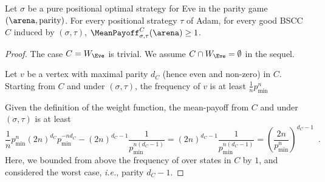 \begin{lemma}
  Let $\sigma$ be a pure positional optimal strategy for Eve in
  the parity game $(\arena,\textrm{parity})$. For every positional
  strategy $\tau$ of Adam, for every good BSCC $C$ induced by
  $(\sigma,\tau)$, $\MeanPayoff_{\sigma,\tau}^C(\arena) \geq 1$.
\end{lemma}
\begin{proof}
  The case $C = W_\Eve$ is trivial. We assume
  $C \cap W_\Eve = \emptyset$ in the sequel.
  
  Let $v$ be a vertex with maximal parity $d_C$ (hence even and
  non-zero) in $C$. Starting from $C$ and under $(\sigma,\tau)$,
  the frequency of $v$ is at least $\frac{1}{n} p_{\min}^n$

  Given the definition of the weight function, the mean-payoff
  from $C$ and under $(\sigma,\tau)$ is at least
  \[
    \frac{1}{n} p_{\min}^n (2n)^{d_C} p_{\min}^{-n d_C} -
    (2n)^{d_C -1} \frac{1}{p_{\min}^{n (d_C-1)}} = (2n)^{d_C -1}
    \frac{1}{p_{\min}^{n (d_C-1)}} =
    (\frac{2n}{p_{\min}^n})^{d_C{-}1}\enspace.
  \]
  Here, we bounded from above the frequency of over states in $C$
  by $1$, and considered the worst case, \emph{i.e.}, parity
  $d_C-1$.
\end{proof}

